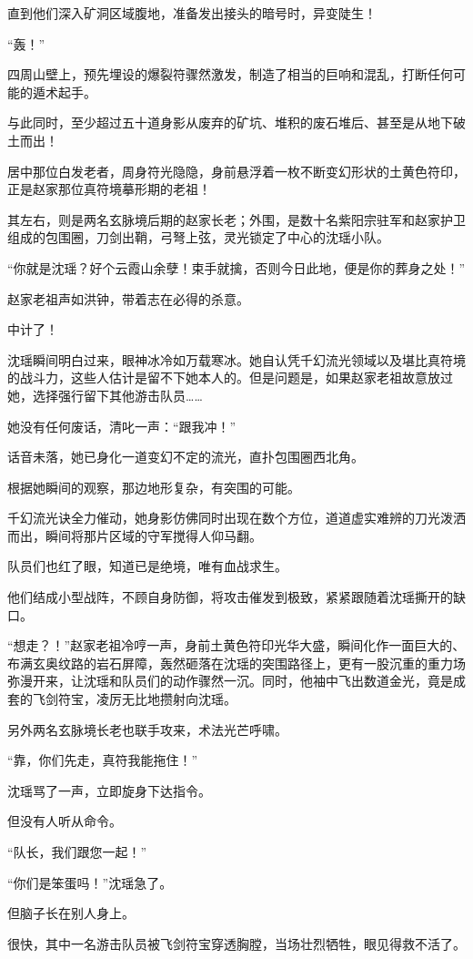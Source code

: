 直到他们深入矿洞区域腹地，准备发出接头的暗号时，异变陡生！

“轰！”

四周山壁上，预先埋设的爆裂符骤然激发，制造了相当的巨响和混乱，打断任何可能的遁术起手。

与此同时，至少超过五十道身影从废弃的矿坑、堆积的废石堆后、甚至是从地下破土而出！

居中那位白发老者，周身符光隐隐，身前悬浮着一枚不断变幻形状的土黄色符印，正是赵家那位真符境摹形期的老祖！

其左右，则是两名玄脉境后期的赵家长老；外围，是数十名紫阳宗驻军和赵家护卫组成的包围圈，刀剑出鞘，弓弩上弦，灵光锁定了中心的沈瑶小队。

“你就是沈瑶？好个云霞山余孽！束手就擒，否则今日此地，便是你的葬身之处！”

赵家老祖声如洪钟，带着志在必得的杀意。

中计了！

沈瑶瞬间明白过来，眼神冰冷如万载寒冰。她自认凭千幻流光领域以及堪比真符境的战斗力，这些人估计是留不下她本人的。但是问题是，如果赵家老祖故意放过她，选择强行留下其他游击队员……

她没有任何废话，清叱一声：“跟我冲！”

话音未落，她已身化一道变幻不定的流光，直扑包围圈西北角。

根据她瞬间的观察，那边地形复杂，有突围的可能。

千幻流光诀全力催动，她身影仿佛同时出现在数个方位，道道虚实难辨的刀光泼洒而出，瞬间将那片区域的守军搅得人仰马翻。

队员们也红了眼，知道已是绝境，唯有血战求生。

他们结成小型战阵，不顾自身防御，将攻击催发到极致，紧紧跟随着沈瑶撕开的缺口。

“想走？！”赵家老祖冷哼一声，身前土黄色符印光华大盛，瞬间化作一面巨大的、布满玄奥纹路的岩石屏障，轰然砸落在沈瑶的突围路径上，更有一股沉重的重力场弥漫开来，让沈瑶和队员们的动作骤然一沉。同时，他袖中飞出数道金光，竟是成套的飞剑符宝，凌厉无比地攒射向沈瑶。

另外两名玄脉境长老也联手攻来，术法光芒呼啸。

“靠，你们先走，真符我能拖住！”

沈瑶骂了一声，立即旋身下达指令。

但没有人听从命令。

“队长，我们跟您一起！”

“你们是笨蛋吗！”沈瑶急了。

但脑子长在别人身上。

很快，其中一名游击队员被飞剑符宝穿透胸膛，当场壮烈牺牲，眼见得救不活了。

